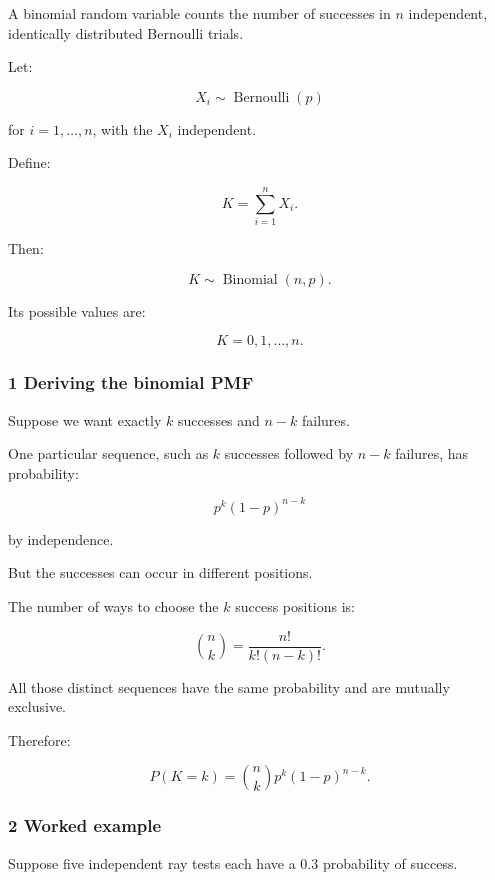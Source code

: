 A binomial random variable counts the number of successes in \(n\) independent, identically distributed Bernoulli trials.

Let:

\[
 X_i\sim\operatorname{Bernoulli}(p)
\]

for \(i=1,\ldots,n\), with the \(X_i\) independent.

Define:

\[
 K=\sum_{i=1}^nX_i.
\]

Then:

\[
 \boxed{K\sim\operatorname{Binomial}(n,p)}.
\]

Its possible values are:

\[
 K=0,1,\ldots,n.
\]

\subsubsection{1 Deriving the binomial PMF}\label{02-foundations-ii-ch023-deriving-the-binomial-pmf}

\hypertarget{02-foundations-ii-ch023-deriving-the-binomial-pmf}{}

Suppose we want exactly \(k\) successes and \(n-k\) failures.

One particular sequence, such as \(k\) successes followed by \(n-k\) failures, has probability:

\[
 p^k(1-p)^{n-k}
\]

by independence.

But the successes can occur in different positions.

The number of ways to choose the \(k\) success positions is:

\[
 \binom nk= \frac{n!}{k!(n-k)!}.
\]

All those distinct sequences have the same probability and are mutually exclusive.

Therefore:

\[
 \boxed{ P(K=k) = \binom nkp^k(1-p)^{n-k} }.
\]

\begin{allmightroleexample}

\subsubsection{2 Worked example}\label{02-foundations-ii-ch023-worked-example}

\hypertarget{02-foundations-ii-ch023-worked-example}{}

Suppose five independent ray tests each have a \(0.3\) probability of success.

\end{allmightroleexample}

